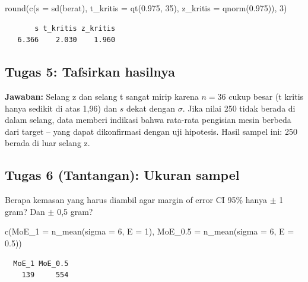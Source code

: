 \documentclass[
  indonesian,
  letterpaper,
]{book}
\newenvironment{Shaded}{\begin{snugshade}}{\end{snugshade}}
\newcommand{\AttributeTok}[1]{\textcolor[rgb]{0.40,0.45,0.13}{#1}}
\newcommand{\DecValTok}[1]{\textcolor[rgb]{0.68,0.00,0.00}{#1}}
\newcommand{\FloatTok}[1]{\textcolor[rgb]{0.68,0.00,0.00}{#1}}
\newcommand{\FunctionTok}[1]{\textcolor[rgb]{0.28,0.35,0.67}{#1}}
\newcommand{\NormalTok}[1]{\textcolor[rgb]{0.00,0.23,0.31}{#1}}
\begin{document}
\begin{Shaded}
\begin{Highlighting}[]
\FunctionTok{round}\NormalTok{(}\FunctionTok{c}\NormalTok{(}\AttributeTok{s =} \FunctionTok{sd}\NormalTok{(berat), }\AttributeTok{t\_kritis =} \FunctionTok{qt}\NormalTok{(}\FloatTok{0.975}\NormalTok{, }\DecValTok{35}\NormalTok{), }\AttributeTok{z\_kritis =} \FunctionTok{qnorm}\NormalTok{(}\FloatTok{0.975}\NormalTok{)), }\DecValTok{3}\NormalTok{)}
\end{Highlighting}
\end{Shaded}

\begin{verbatim}
       s t_kritis z_kritis 
   6.366    2.030    1.960 
\end{verbatim}

\subsection{Tugas 5: Tafsirkan
hasilnya}\label{tugas-5-tafsirkan-hasilnya}

\textbf{Jawaban:} Selang z dan selang t sangat mirip karena \(n = 36\)
cukup besar (t kritis hanya sedikit di atas 1,96) dan \(s\) dekat dengan
\(\sigma\). Jika nilai 250 tidak berada di dalam selang, data memberi
indikasi bahwa rata-rata pengisian mesin berbeda dari target -- yang
dapat dikonfirmasi dengan uji hipotesis. Hasil sampel ini: 250 berada di
luar selang z.

\subsection{Tugas 6 (Tantangan): Ukuran
sampel}\label{tugas-6-tantangan-ukuran-sampel}

Berapa kemasan yang harus diambil agar margin of error CI 95\% hanya
\(\pm\) 1 gram? Dan \(\pm\) 0,5 gram?

\begin{Shaded}
\begin{Highlighting}[]
\FunctionTok{c}\NormalTok{(}\AttributeTok{MoE\_1 =} \FunctionTok{n\_mean}\NormalTok{(}\AttributeTok{sigma =} \DecValTok{6}\NormalTok{, }\AttributeTok{E =} \DecValTok{1}\NormalTok{), }\AttributeTok{MoE\_0.5 =} \FunctionTok{n\_mean}\NormalTok{(}\AttributeTok{sigma =} \DecValTok{6}\NormalTok{, }\AttributeTok{E =} \FloatTok{0.5}\NormalTok{))}
\end{Highlighting}
\end{Shaded}

\begin{verbatim}
  MoE_1 MoE_0.5 
    139     554 
\end{verbatim}
\end{document}
